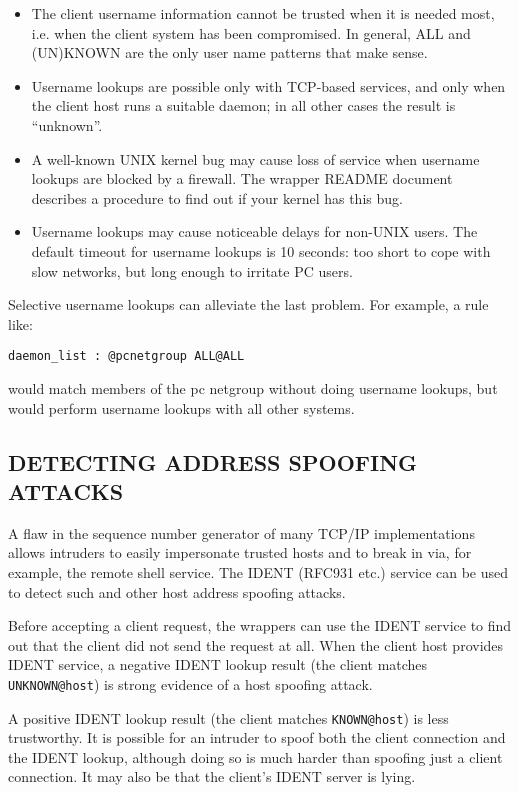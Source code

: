 \documentclass[11pt,twoside,onecolumn]{book}
\begin{document}
\begin{itemize}

\item The client username information cannot be trusted when it is needed
most, i.e. when the client system has been compromised.  In general,
ALL and (UN)KNOWN are the only user name patterns that make sense.

\item Username lookups are possible only with TCP-based services, and only
when the client host runs a suitable daemon; in all other cases the
result is ``unknown''.

\item A well-known UNIX kernel bug may cause loss of service when username
lookups are blocked by a firewall. The wrapper README document
describes a procedure to find out if your kernel has this bug.

\item Username lookups may cause noticeable delays for non-UNIX users.  The
default timeout for username lookups is 10 seconds: too short to cope
with slow networks, but long enough to irritate PC users.

\end{itemize}

Selective username lookups can alleviate the last problem. For example,
a rule like:

{\tt daemon\_list : @pcnetgroup ALL@ALL }

would match members of the pc netgroup without doing username lookups,
but would perform username lookups with all other systems.

\subsection*{DETECTING ADDRESS SPOOFING ATTACKS}

A flaw in the sequence number generator of many TCP/IP implementations
allows intruders to easily impersonate trusted hosts and to break in
via, for example, the remote shell service.  The IDENT (RFC931 etc.)
service can be used to detect such and other host address spoofing
attacks.

Before accepting a client request, the wrappers can use the IDENT
service to find out that the client did not send the request at all.
When the client host provides IDENT service, a negative IDENT lookup
result (the client matches {\tt UNKNOWN@host}) is strong evidence of a host
spoofing attack.

A positive IDENT lookup result (the client matches {\tt KNOWN@host}) is
less trustworthy. It is possible for an intruder to spoof both the
client connection and the IDENT lookup, although doing so is much
harder than spoofing just a client connection. It may also be that
the client's IDENT server is lying.
\end{document}
